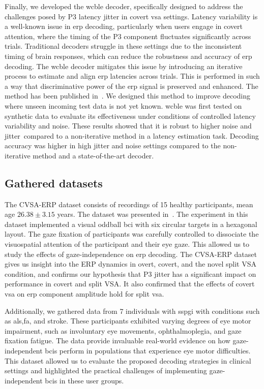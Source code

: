 Finally, we developed the \acf{wcble} decoder, specifically designed to address
the challenges posed by P3 latency jitter in covert \ac{vsa} settings.
Latency variability is a well-known issue in \ac{erp} decoding, particularly
when users engage in covert attention, where the timing of the P3 component
fluctuates significantly across trials.
Traditional decoders struggle in these settings due to the inconsistent timing
of brain responses, which can reduce the robustness and accuracy of
\ac{erp} decoding.
The \ac{wcble} decoder mitigates this issue by introducing an iterative process
to estimate and align \ac{erp} latencies across trials.
This is performed in such a way that discriminative power of the \ac{erp}
signal is preserved and enhanced.
The method has been published in~\textcite{VanDenKerchove2024}.
We designed this method to improve decoding where
unseen incoming test data is not yet known.
\Ac{wcble} was first tested on synthetic data to evaluate its
effectiveness under conditions of controlled latency variability and noise.
These results showed that it is robust to higher noise and jitter\ compared to
a non-iterative method in a latency estimation task.
Decoding accuracy was higher in high jitter and noise
settings compared to the non-iterative method and a state-of-the-art
decoder.

\subsection{Gathered datasets}
The CVSA-ERP dataset consists of recordings of 15 healthy participants, mean age
$26.38\pm3.15$ years.
The dataset was presented in~\textcite{VanDenKerchove2024}.
The experiment in this dataset implemented a visual oddball \ac{bci} with six
circular targets in a hexagonal layout.
The gaze fixation of participants was carefully controlled to dissociate the
visuospatial attention of the participant and their eye gaze.
This allowed us to study the effects of gaze-independence on \ac{erp} decoding.
The CVSA-ERP dataset gives us insight into the ERP dynamics in overt, covert, and the
novel split VSA condition, and confirms our hypothesis that P3 jitter has a
significant impact on performance in covert and split VSA.
It also confirmed that the effects of covert \ac{vsa} on \ac{erp} component
amplitude hold for split \ac{vsa}.

Additionally, we gathered data from 7 individuals with \ac{sspgi} with conditions such as
\ac{als},\ac{fa}, and stroke.
These participants exhibited varying degrees of eye motor impairment, such as
involuntary eye movements, ophthalmoplegia, and gaze fixation fatigue.
The data provide invaluable real-world evidence on how gaze-independent
\acp{bci} perform in populations that experience eye motor difficulties.
This dataset allowed us to evaluate the proposed decoding strategies in clinical settings and
highlighted the practical challenges of implementing gaze-independent \acp{bci} in these user
groups.

